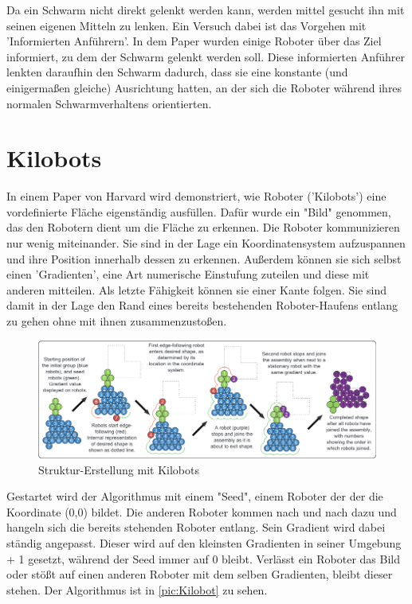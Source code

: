 Da ein Schwarm nicht direkt gelenkt werden kann, werden mittel gesucht ihn mit seinen eigenen Mitteln zu lenken. Ein Versuch dabei ist das Vorgehen mit 'Informierten Anführern'. In dem Paper wurden einige Roboter über das Ziel informiert, zu dem der Schwarm gelenkt werden soll. Diese informierten Anführer lenkten daraufhin den Schwarm dadurch, dass sie eine konstante (und einigermaßen gleiche) Ausrichtung hatten, an der sich die Roboter während ihres normalen Schwarmverhaltens orientierten.\cite{RobotLeader}

\newpage\section{Kilobots}


In einem Paper von Harvard wird demonstriert, wie Roboter ('Kilobots') eine vordefinierte Fläche eigenständig ausfüllen. Dafür wurde ein "Bild" genommen, das den Robotern dient um die Fläche zu erkennen. Die Roboter kommunizieren nur wenig miteinander. Sie sind in der Lage ein Koordinatensystem aufzuspannen und ihre Position innerhalb dessen zu erkennen. Außerdem können sie sich selbst einen 'Gradienten', eine Art numerische Einstufung zuteilen und diese mit anderen mitteilen. Als letzte Fähigkeit können sie einer Kante folgen. Sie sind damit in der Lage den Rand eines bereits bestehenden Roboter-Haufens entlang zu gehen ohne mit ihnen zusammenzustoßen.

\begin{figure}[h]
	\includegraphics[width=\textwidth,keepaspectratio]{graphics/Kilobot.png}
	\caption{Struktur-Erstellung mit Kilobots}
	\label{pic:Kilobot}
\end{figure}

Gestartet wird der Algorithmus mit einem "Seed", einem Roboter der der die Koordinate (0,0) bildet. Die anderen Roboter kommen nach und nach dazu und hangeln sich die bereits stehenden Roboter entlang. Sein Gradient wird dabei ständig angepasst. Dieser wird auf den kleinsten Gradienten in seiner Umgebung + 1 gesetzt, während der Seed immer auf 0 bleibt.
Verlässt ein Roboter das Bild oder stößt auf einen anderen Roboter mit dem selben Gradienten, bleibt dieser stehen.\cite{Kilobot} Der Algorithmus ist in \autoref{pic:Kilobot} zu sehen.

